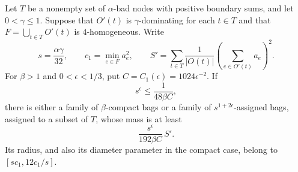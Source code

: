 \begin{lemma}\label{hb:homogeneous-bags}
Let $T$ be a nonempty set of $\alpha$-bad nodes with positive boundary
sums, and let $0<\gamma\le1$.  Suppose that $O'(t)$ is
$\gamma$-dominating for each $t\in T$
and that $F=\bigcup_{t\in T}O'(t)$ is $4$-homogeneous.  Write
\[
 s=\frac{\alpha\gamma}{32},\qquad
 c_1=\min_{e\in F}a_e^2,
 \qquad
 S'=\sum_{t\in T}\frac1{|O(t)|}
                     \left(\sum_{e\in O'(t)}a_e\right)^2.
\]
For $\beta>1$ and $0<\epsilon<1/3$, put
$C=C_1(\epsilon)=1024\epsilon^{-2}$.  If
\begin{equation}\label{hb:smallness}
 s^\epsilon\le\frac1{48\beta C},
\end{equation}
there is either a family of $\beta$-compact bags or a family of
$s^{1+2\epsilon}$-assigned bags, assigned to a subset of $T$, whose
mass is at least
\begin{equation}\label{hb:one-mass}
 \frac{s^\epsilon}{192\beta C}\,S'.
\end{equation}
Its radius, and also its diameter parameter in the compact case,
belong to $[sc_1,12c_1/s]$.
\end{lemma}
